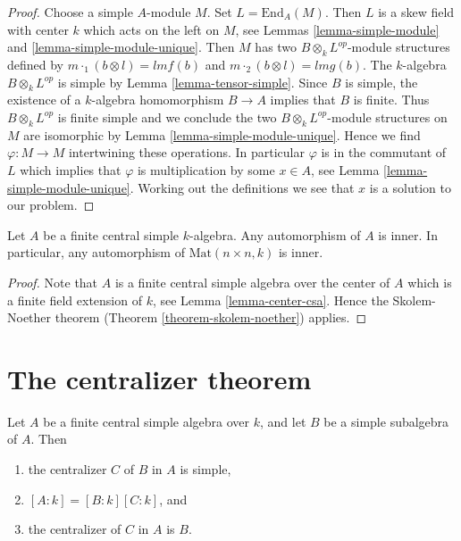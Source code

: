 \begin{proof}
Choose a simple $A$-module $M$. Set $L = \text{End}_A(M)$.
Then $L$ is a skew field with center $k$ which acts on the left on $M$, see
Lemmas \ref{lemma-simple-module} and \ref{lemma-simple-module-unique}.
Then $M$ has two $B \otimes_k L^{op}$-module structures defined by
$m \cdot_1 (b \otimes l) = lmf(b)$ and $m \cdot_2 (b \otimes l) = lmg(b)$.
The $k$-algebra $B \otimes_k L^{op}$ is simple by
Lemma \ref{lemma-tensor-simple}. Since $B$ is simple, the existence of a
$k$-algebra homomorphism $B \to A$ implies that $B$ is finite. Thus
$B \otimes_k L^{op}$ is finite simple and we conclude the two
$B \otimes_k L^{op}$-module structures on $M$
are isomorphic by Lemma \ref{lemma-simple-module-unique}.
Hence we find $\varphi : M \to M$ intertwining these operations.
In particular $\varphi$ is in the commutant of $L$ which implies that
$\varphi$ is multiplication by some $x \in A$, see
Lemma \ref{lemma-simple-module-unique}. Working out the definitions we see
that $x$ is a solution to our problem.
\end{proof}

\begin{lemma}
\label{lemma-automorphism-inner}
Let $A$ be a finite central simple $k$-algebra. Any automorphism of $A$ is
inner. In particular, any automorphism of $\text{Mat}(n \times n, k)$
is inner.
\end{lemma}

\begin{proof}
Note that $A$ is a finite central simple algebra over the center
of $A$ which is a finite field extension of $k$, see
Lemma \ref{lemma-center-csa}.
Hence the Skolem-Noether theorem (Theorem \ref{theorem-skolem-noether})
applies.
\end{proof}



\section{The centralizer theorem}
\label{section-centralizer}


\begin{theorem}
\label{theorem-centralizer}
Let $A$ be a finite central simple algebra over $k$, and let
$B$ be a simple subalgebra of $A$. Then
\begin{enumerate}
\item the centralizer $C$ of $B$ in $A$ is simple,
\item $[A : k] = [B : k][C : k]$, and
\item the centralizer of $C$ in $A$ is $B$.
\end{enumerate}
\end{theorem}

